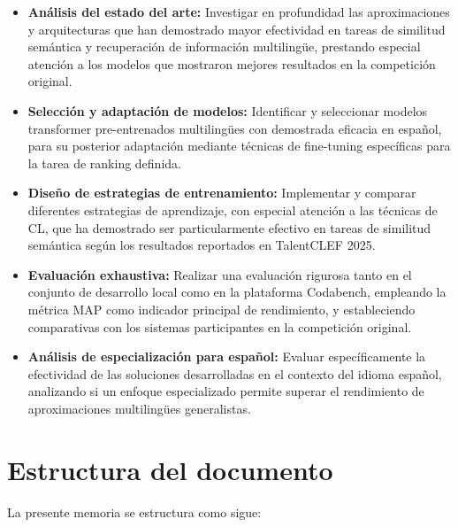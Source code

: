 \begin{itemize}
    \item \textbf{Análisis del estado del arte:} Investigar en profundidad las aproximaciones y arquitecturas que han demostrado mayor efectividad en tareas de similitud semántica y recuperación de información multilingüe, prestando especial atención a los modelos que mostraron mejores resultados en la competición original.

    \item \textbf{Selección y adaptación de modelos:} Identificar y seleccionar modelos transformer pre-entrenados multilingües con demostrada eficacia en español, para su posterior adaptación mediante técnicas de fine-tuning específicas para la tarea de ranking definida.

    \item \textbf{Diseño de estrategias de entrenamiento:} Implementar y comparar diferentes estrategias de aprendizaje, con especial atención a las técnicas de \gls{CL}, que ha demostrado ser particularmente efectivo en tareas de similitud semántica según los resultados reportados en TalentCLEF 2025.

    \item \textbf{Evaluación exhaustiva:} Realizar una evaluación rigurosa tanto en el conjunto de desarrollo local como en la plataforma Codabench, empleando la métrica \gls{MAP} como indicador principal de rendimiento, y estableciendo comparativas con los sistemas participantes en la competición original.

    \item \textbf{Análisis de especialización para español:} Evaluar específicamente la efectividad de las soluciones desarrolladas en el contexto del idioma español, analizando si un enfoque especializado permite superar el rendimiento de aproximaciones multilingües generalistas.
\end{itemize}


\section{Estructura del documento}
\label{sec:EstructuraDelDocumento}

\noindent La presente memoria se estructura como sigue:

